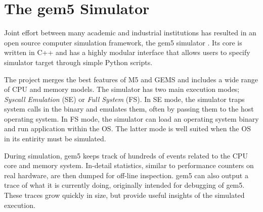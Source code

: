 \section{The gem5 Simulator}

Joint effort between many academic and industrial institutions has resulted in
an open source computer simulation framework, the gem5 simulator \cite{gem5}.
Its core is written in C++ and has a highly modular interface that allows users
to specify simulator target through simple Python scripts.

The project merges the best features of M5 \cite{M5} and GEMS \cite{GEMS} and
includes a wide range of CPU and memory models. The simulator has two main
execution modes; \textit{Syscall Emulation} (SE) or \textit{Full System} (FS).
In SE mode, the simulator traps system calls in the binary and emulates them,
often by passing them to the host operating system. In FS mode, the simulator
can load an operating system binary and run application within the OS. The
latter mode is well suited when the OS in its entirity must be simulated.

During simulation, gem5 keeps track of hundreds of events related to the CPU
core and memory system. In-detail statistics, similar to performance counters on
real hardware, are then dumped for off-line inspection. gem5 can also output a
trace of what it is currently doing, originally intended for debugging of gem5.
These traces grow quickly in size, but provide useful insights of the simulated
execution.
